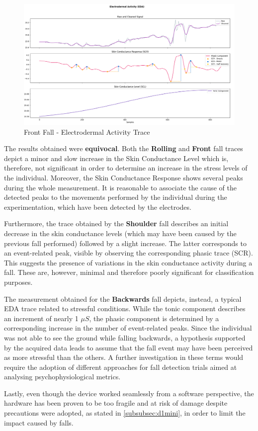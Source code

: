 \begin{figure}[H]
    \centering
    \includegraphics[width=\textwidth]{./images/bitalino/Front.png}
    \caption{Front Fall - Electrodermal Activity Trace}
    \label{fig:bitalino-front}
\end{figure}

\pagebreak

The results obtained were \textbf{equivocal}. Both the \textbf{Rolling} and \textbf{Front} fall traces depict a minor and slow increase in the Skin Conductance Level which is, therefore, not significant in order to determine an increase in the stress levels of the individual. Moreover, the Skin Conductance Response shows several peaks during the whole measurement. It is reasonable to associate the cause of the detected peaks to the movements performed by the individual during the experimentation, which have been detected by the electrodes.

Furthermore, the trace obtained by the \textbf{Shoulder} fall describes an initial decrease in the skin conductance levels (which may have been caused by the previous fall performed) followed by a slight increase. The latter corresponds to an event-related peak, visible by observing the corresponding phasic trace (SCR). This suggests the presence of variations in the skin conductance activity during a fall. These are, however, minimal and therefore poorly significant for classification purposes.

The measurement obtained for the \textbf{Backwards} fall depicts, instead, a typical EDA trace related to stressful conditions. While the tonic component describes an increment of nearly 1 $\mu S$, the phasic component is determined by a corresponding increase in the number of event-related peaks. Since the individual was not able to see the ground while falling backwards, a hypothesis supported by the acquired data leads to assume that the fall event may have been perceived as more stressful than the others. A further investigation in these terms would require the adoption of different approaches for fall detection trials aimed at analysing psychophysiological metrics.

Lastly, even though the device worked seamlessly from a software perspective, the hardware has been proven to be too fragile and at risk of damage despite precautions were adopted, as stated in \ref{subsubsec:d1mini}, in order to limit the impact caused by falls.



